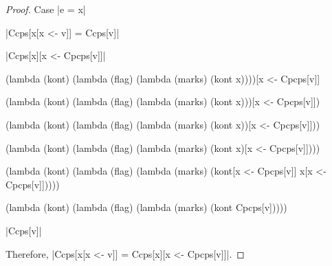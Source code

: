 \begin{proof}{Case \scheme|e = x|}

\noindent
\scheme|Ccps[x[x <- v]] = Ccps[v]|

\noindent
\scheme|Ccps[x][x <- Cpcps[v]]|

\begin{schemeblock}
\begin{schemedisplay}
(lambda (kont)
  (lambda (flag)
    (lambda (marks)
      (kont x))))[x <- Cpcps[v]]
\end{schemedisplay}
\end{schemeblock}

\begin{schemeblock}
\begin{schemedisplay}
(lambda (kont)
  (lambda (flag)
    (lambda (marks)
      (kont x)))[x <- Cpcps[v]])
\end{schemedisplay}
\end{schemeblock}

\begin{schemeblock}
\begin{schemedisplay}
(lambda (kont)
  (lambda (flag)
    (lambda (marks)
      (kont x))[x <- Cpcps[v]]))
\end{schemedisplay}
\end{schemeblock}

\begin{schemeblock}
\begin{schemedisplay}
(lambda (kont)
  (lambda (flag)
    (lambda (marks)
      (kont x)[x <- Cpcps[v]])))
\end{schemedisplay}
\end{schemeblock}

\begin{schemeblock}
\begin{schemedisplay}
(lambda (kont)
  (lambda (flag)
    (lambda (marks)
      (kont[x <- Cpcps[v]] x[x <- Cpcps[v]]))))
\end{schemedisplay}
\end{schemeblock}

\begin{schemeblock}
\begin{schemedisplay}
(lambda (kont)
  (lambda (flag)
    (lambda (marks)
      (kont Cpcps[v]))))
\end{schemedisplay}
\end{schemeblock}

\noindent
\scheme|Ccps[v]|

Therefore, \scheme|Ccps[x[x <- v]] = Ccps[x][x <- Cpcps[v]]|.
\end{proof}


